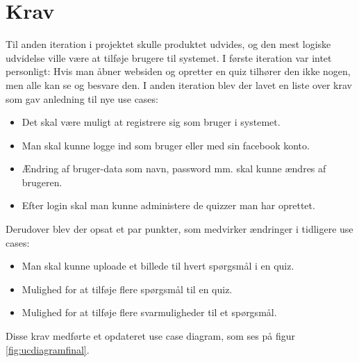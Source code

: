 \section{Krav}
Til anden iteration i projektet skulle produktet udvides, og den mest logiske udvidelse ville være at tilføje brugere til systemet. I første iteration var intet personligt: Hvis man åbner websiden og opretter en quiz tilhører den ikke nogen, men alle kan se og besvare den.
I anden iteration blev der lavet en liste over krav som gav anledning til nye use cases:
\begin{itemize}
\item Det skal være muligt at registrere sig som bruger i systemet.
\item Man skal kunne logge ind som bruger eller med sin facebook konto.
\item Ændring af bruger-data som navn, password mm. skal kunne ændres af brugeren.
\item Efter login skal man kunne administere de quizzer man har oprettet.
\end{itemize}

Derudover blev der opsat et par punkter, som medvirker ændringer i tidligere use cases:
\begin{itemize}
\item Man skal kunne uploade et billede til hvert spørgsmål i en quiz.
\item Mulighed for at tilføje flere spørgsmål til en quiz.
\item Mulighed for at tilføje flere svarmuligheder til et spørgsmål.
\end{itemize}

Disse krav medførte et opdateret use case diagram, som ses på figur \ref{fig:ucdiagramfinal}.


